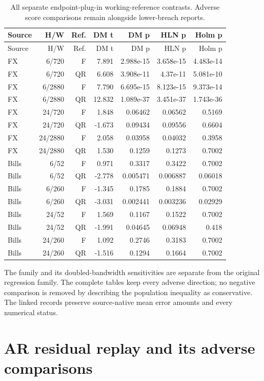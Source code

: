 \documentclass[11pt,a4paper]{article}
\begin{document}
\begingroup
\scriptsize
\setlength{\tabcolsep}{3pt}
\renewcommand{\arraystretch}{1.12}
\begin{longtable}{lrrrrrr}
\caption{All separate endpoint-plug-in working-reference contrasts. Adverse score comparisons remain alongside lower-breach reports.}\\
\toprule
Source & H/W & Ref. & DM t & DM p & HLN p & Holm p \\
\midrule
\endfirsthead
\toprule
Source & H/W & Ref. & DM t & DM p & HLN p & Holm p \\
\midrule
\endhead
\bottomrule
\endfoot
FX & 6/720 & F & 7.891 & 2.988e-15 & 3.658e-15 & 4.483e-14 \\
FX & 6/720 & QR & 6.608 & 3.908e-11 & 4.37e-11 & 5.081e-10 \\
FX & 6/2880 & F & 7.790 & 6.695e-15 & 8.123e-15 & 9.373e-14 \\
FX & 6/2880 & QR & 12.832 & 1.089e-37 & 3.451e-37 & 1.743e-36 \\
FX & 24/720 & F & 1.848 & 0.06462 & 0.06562 & 0.5169 \\
FX & 24/720 & QR & -1.673 & 0.09434 & 0.09556 & 0.6604 \\
FX & 24/2880 & F & 2.058 & 0.03958 & 0.04032 & 0.3958 \\
FX & 24/2880 & QR & 1.530 & 0.1259 & 0.1273 & 0.7002 \\
Bills & 6/52 & F & 0.971 & 0.3317 & 0.3422 & 0.7002 \\
Bills & 6/52 & QR & -2.778 & 0.005471 & 0.006887 & 0.06018 \\
Bills & 6/260 & F & -1.345 & 0.1785 & 0.1884 & 0.7002 \\
Bills & 6/260 & QR & -3.031 & 0.002441 & 0.003236 & 0.02929 \\
Bills & 24/52 & F & 1.569 & 0.1167 & 0.1522 & 0.7002 \\
Bills & 24/52 & QR & -1.991 & 0.04645 & 0.06948 & 0.418 \\
Bills & 24/260 & F & 1.092 & 0.2746 & 0.3183 & 0.7002 \\
Bills & 24/260 & QR & -1.516 & 0.1294 & 0.1664 & 0.7002 \\
\end{longtable}
\endgroup

The family and its doubled-bandwidth sensitivities are separate
from the original regression family. The complete tables keep every adverse
direction; no negative comparison is removed by describing the population
inequality as conservative. The linked records preserve source-native mean
error amounts and every numerical status.\section{AR residual replay and its adverse comparisons}\label{sup:ar}
\end{document}
